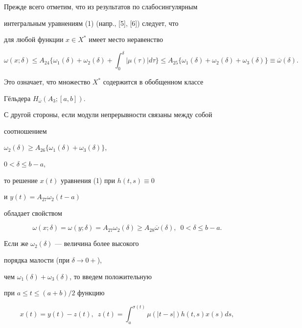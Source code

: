 \begin{pf}


Прежде всего отметим, что из результатов по слабосингулярным


интегральным уравнениям (1) (напр., [5], [6]) следует, что


для любой функции $x\in X^*$ имеет место неравенство


$$


\omega(x;\delta)\leq A_{24}\bigg\{ \omega_1(\delta)+ \omega_2(\delta)+


\int_0^\delta |\mu(\tau)| d\tau \bigg\}\leq


A_{25}\bigl\{ \omega_1(\delta)+ \omega_2(\delta)+


\omega_3(\delta)\bigr\} \equiv \overline{\omega}(\delta).


$$


Это означает, что множество $X^*$ содержится в обобщенном классе


Г\"ельдера $H_{\overline{\omega}}(A_3;[a,b])$.


С другой стороны, если модули непрерывности связаны между собой


соотношением


$\omega_2(\delta)\geq A_{26}\bigl\{\omega_1(\delta)+\omega_3(\delta)\bigr\}$,


$0<\delta\leq b-a$,


то решение $x(t)$ уравнения (1) при $h(t,s)\equiv 0$


и $y(t)=A_{27} \omega_2(t-a)$


обладает свойством


\begin{equation}


\omega(x;\delta)=\omega(y;\delta)= A_{27} \omega_2(\delta)\geq


A_{28} \overline{\omega}(\delta),\ \; 0<\delta\leq b-a.


\end{equation}


Если же $\omega_2(\delta)$ --- величина более высокого


порядка малости (при $\delta\rightarrow 0+$),


чем $\omega_1(\delta)+\omega_3(\delta)$, то введем положительную


при $a\leq t\leq (a+b)/2$ функцию


$$


x(t)=y(t)-z(t),\ \; z(t)=\int_a^{\sigma(t)}\mu(|t-s|)h(t,s)x(s) ds,


$$



\end{pf}
